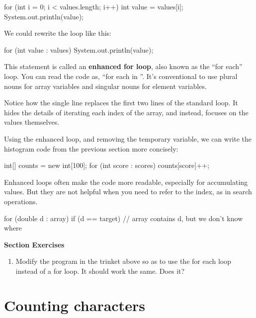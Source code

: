 \begin{code}
for (int i = 0; i < values.length; i++) {
    int value = values[i];
    System.out.println(value);
}
\end{code}

We could rewrite the loop like this:

\begin{code}
for (int value : values) {
    System.out.println(value);
}
\end{code}


This statement is called an {\bf enhanced for loop}, also known as the ``for each'' loop.
You can read the code as, ``for each  in ''.
It's conventional to use plural nouns for array variables and singular nouns for element variables.

Notice how the single line  replaces the first two lines of the standard  loop.
It hides the details of iterating each index of the array, and instead, focuses on the values themselves.

Using the enhanced  loop, and removing the temporary variable, we can write the histogram code from the previous section more concisely:

\begin{code}
int[] counts = new int[100];
for (int score : scores) {
    counts[score]++;
}
\end{code}

Enhanced  loops often make the code more readable, especially for accumulating values.
But they are not helpful when you need to refer to the index, as in search operations.

\begin{code}
for (double d : array) {
    if (d == target) {
        // array contains d, but we don't know where
    }
}
\end{code}

\textbf{Section Exercises}
\begin{enumerate}
\item Modify the  program in the trinket above so as to use the for each loop instead of a for loop.  It should work the same.  Does it?
\end{enumerate}


\section{Counting characters}

